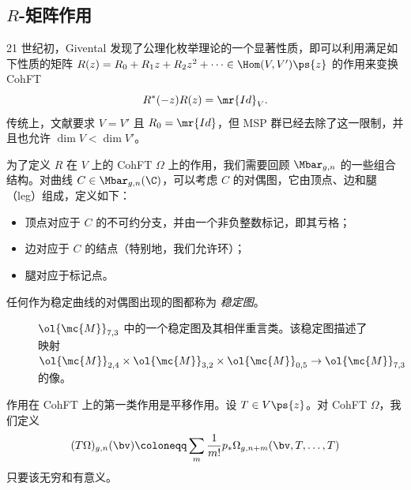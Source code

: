 \subsection{$R$-矩阵作用}%
\label{sub:R-matrix action}

21 世纪初，Givental 发现了公理化枚举理论的一个显著性质，即可以利用满足如下性质的矩阵 $R(z) = R_0 + R_1 z + R_2 z^2 + \cdots \in \Hom(V, V')\ps{z}$ 的作用来变换 CohFT
\[ R^*(-z) R(z) = \mr{Id}_V. \]
传统上，文献要求 $V = V'$ 且 $R_0 = \mr{Id}$，但 MSP 群已经去除了这一限制，并且也允许 $\dim V < \dim V'$。

为了定义 $R$ 在 $V$ 上的 CohFT $\Omega$ 上的作用，我们需要回顾 $\Mbar_{g,n}$ 的一些组合结构。对曲线 $C\in \Mbar_{g,n}(\C)$，可以考虑 $C$ 的对偶图，它由顶点、边和腿（leg）组成，定义如下：
\begin{itemize}
    \item 顶点对应于 $C$ 的不可约分支，并由一个非负整数标记，即其亏格；
    \item 边对应于 $C$ 的结点（特别地，我们允许环）；
    \item 腿对应于标记点。
\end{itemize}
任何作为稳定曲线的对偶图出现的图都称为 \textit{稳定图}。

\begin{figure}[htpb]
  \centering
  \caption{$\ol{\mc{M}}_{7,3}$ 中的一个稳定图及其相伴重言类。该稳定图描述了映射
    $\ol{\mc{M}}_{2,4} \times \ol{\mc{M}}_{3,2} \times \ol{\mc{M}}_{0,5} \to \ol{\mc{M}}_{7,3}$ 的像。}
  \label{fig:stablegraph}
\end{figure}

作用在 CohFT 上的第一类作用是平移作用。设 $T \in V\ps{z}$。对 CohFT $\Omega$，我们定义
\[ (T\Omega)_{g,n}(\bv) \coloneqq \sum_m \frac{1}{m!} p_* \Omega_{g,n+m}(\bv, T,\ldots,T) \]
只要该无穷和有意义。

